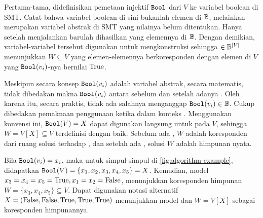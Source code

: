 Pertama-tama, didefinisikan pemetaan injektif \(\boolmap\) dari \(V\) ke variabel boolean di SMT. Catat bahwa variabel boolean di sini bukanlah elemen di \(\Bbb\), melainkan merupakan variabel abstrak di SMT yang nilainya belum ditentukan. Hanya setelah menjalankan  barulah dihasilkan  yang elemennya di \(\Bbb\). Dengan demikian, variabel-variabel tersebut digunakan untuk mengkonstruksi  sehingga  \(\in \Bbb^{|V|}\) menunjukkan \(W \subseteq V\) yang elemen-elemennya berkoresponden dengan elemen di \(V\) yang \(\boolmap(v_i)\)-nya bernilai \(\True\).

Meskipun secara konsep \(\boolmap(v_i)\) adalah variabel abstrak, secara matematis, tidak dibedakan makna \(\boolmap(v_i)\) antara sebelum dan setelah adanya . Oleh karena itu, secara praktis, tidak ada salahnya menganggap \(\boolmap(v_i) \in \Bbb\). Cukup dibedakan pemaknaan penggunaan ketika dalam konteks . Menggunakan konvensi ini, \(\boolmap(V) = X\) dapat digunakan langsung untuk  pada \(V\), sehingga \(W = V[X] \subseteq V\) terdefinisi dengan baik. Sebelum ada , \(W\) adalah koresponden dari ruang solusi terhadap , dan setelah ada , solusi \(W\) adalah himpunan nyata.

\begin{example}
	Bila \(\boolmap(v_i) = x_i\), maka untuk simpul-simpul di \autoref{fig:algorithm-example}, didapatkan \(\boolmap(V) = \{x_1, x_2, x_3, x_4, x_5\} = X\). Kemudian, model \(x_3 = x_4 = x_5 = \True, x_1 = x_2 = \False\), menunjukkan koresponden himpunan \(W = \{x_3, x_4, x_5\} \subseteq V\). Dapat digunakan notasi alternatif \(X = (\False, \False, \True, \True, \True)\) menunjukkan model dan \(W = V[X]\) sebagai koresponden himpunannya.
\end{example}

\vspace{-1em}

